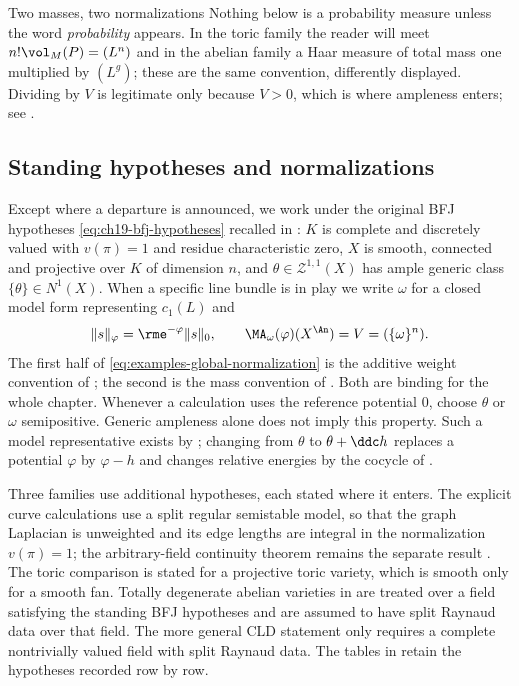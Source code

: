 \begin{warning}{Two masses, two normalizations}
Nothing below is a probability measure unless the word \emph{probability}
appears.  In the toric family the reader will meet
$n!\vol_M(P)=(L^n)$ and in the abelian family a Haar measure of total mass
one multiplied by $(L^g)$; these are the same convention, differently
displayed.  Dividing by $V$ is legitimate only because $V>0$, which is
where ampleness enters; see .
\end{warning}

\subsection{Standing hypotheses and normalizations}
\label{sec:ch31-hypotheses}

Except where a departure is announced, we work under the original BFJ
hypotheses \eqref{eq:ch19-bfj-hypotheses} recalled in
: $K$ is complete and discretely valued with
$v(\pi)=1$ and residue characteristic zero, $X$ is smooth, connected and
projective over $K$ of dimension $n$, and
$\theta\in\mathcal Z^{1,1}(X)$ has ample generic class
$\{\theta\}\in N^1(X)$.  When a specific line bundle is in play we write
$\omega$ for a closed model form representing $c_1(L)$ and
\begin{equation}
              \|s\|_\varphi=\rme^{-\varphi}\|s\|_0,
              \qquad \MA_\omega(\varphi)(X^{\An})
                       =V=(\{\omega\}^n).
\label{eq:examples-global-normalization}
\end{equation}
The first half of \eqref{eq:examples-global-normalization} is the additive
weight convention of ; the second is the mass
convention of .  Both are binding for the whole
chapter.  Whenever a calculation uses the reference potential $0$, choose
$\theta$ or $\omega$ semipositive.  Generic ampleness alone does not imply
this property.  Such a model representative exists by
; changing from $\theta$ to
$\theta+\ddc h$ replaces a potential $\varphi$ by $\varphi-h$ and changes
relative energies by the cocycle of .

Three families use additional hypotheses, each stated where it enters.  The
explicit curve calculations use a split regular semistable model, so that
the graph Laplacian is unweighted and its edge lengths are integral in the
normalization $v(\pi)=1$; the arbitrary-field continuity theorem remains the
separate result .  The toric
comparison  is stated for a projective toric
variety, which is smooth only for a smooth fan.  Totally degenerate abelian
varieties in  are treated over a field satisfying
the standing BFJ hypotheses and are assumed to have split Raynaud data over
that field.  The more general CLD statement only requires a complete
nontrivially valued field with split Raynaud data.  The tables in
 retain the hypotheses recorded row by row.

